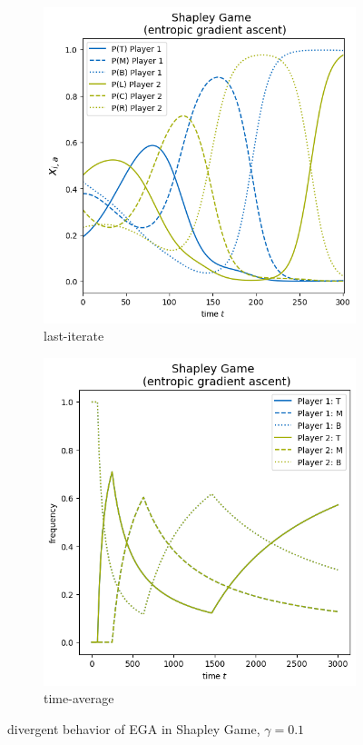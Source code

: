 \begin{figure}[H]
\centering
\begin{subfigure}{.5\textwidth}
    \centering
    \includegraphics[width=\textwidth]{logos/Shapley1.png}
    \caption{last-iterate}
\end{subfigure}%
\begin{subfigure}{.5\textwidth}
    \centering
    \includegraphics[width=\textwidth]{logos/Shapley2.png}
    \caption{time-average}
\end{subfigure}
\caption{divergent behavior of EGA in Shapley Game, $\gamma = 0.1$}
\label{fig:Shapley}
\end{figure}


